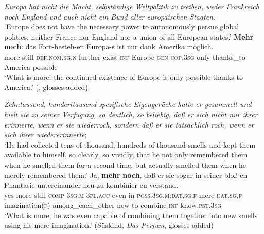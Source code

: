 \begin{exe}
	\ex \textit{Europa hat nicht die Macht, selbständige Weltpolitik zu treiben, weder Frankreich noch England und auch nicht ein Bund aller europäischen Staaten}.\\
	\lq Europe does not have the necessary power to autonomously persue global politics, neither France nor England nor a union of all European states.\rq{}
	\exi{}\gll  \textbf{Mehr} \textbf{noch}: das Fort-besteh-en Europa-s ist nur dank Amerika möglich.\\
	more still \textsc{def}.\textsc{nom}.\textsc{sg}.\textsc{n} further-exist-\textsc{inf} Europe-\textsc{gen} \textsc{cop}.3\textsc{sg} only thanks\_to America possible\\
	\glt \lq What is more: the continued existence of Europe is only possible thanks to America.\rq{ }(\cite[631]{MetrichFaucher2009}, glosses added)
\end{exe}
\begin{exe}
	\ex \textit{Zehntausend, hunderttausend spezifische Eigengerüche hatte er gesammelt und hielt sie zu seiner Verfügung, so deutlich, so beliebig, daß er sich nicht nur ihrer erinnerte, wenn er sie wiederroch, sondern daß er sie tatsächlich roch, wenn er sich ihrer wiedererinnerte};\\
	\lq He had collected tens of thousand, hundreds of thousand smells and kept them available to himself, so clearly, so vividly, that he not only remembered them when he smelled them for a second time, but actually smelled them when he merely remembered them.\rq{}
	\exi{} \gll Ja, \textbf{mehr} \textbf{noch}, daß er sie sogar in seiner bloß-en Phantasie untereinander neu zu kombinier-en verstand.\\
	yes more still \textsc{comp} 3\textsc{sg}.\textsc{m} \textsc{3pl}.\textsc{acc} even in \textsc{poss}.3\textsc{sg}.\textsc{m}:\textsc{dat}.\textsc{sg}.\textsc{f} mere-\textsc{dat}.\textsc{sg}.\textsc{f} imagination(\textsc{f)} among\_each\_other new to combine-\textsc{inf} know.\textsc{pst}.3\textsc{sg}\\
	\glt \lq What is more, he was even capable of combining them together into new smells using his mere imagination.\rq{ }(Süskind, \textit{Das Perfum}, glosses added)
\end{exe}


